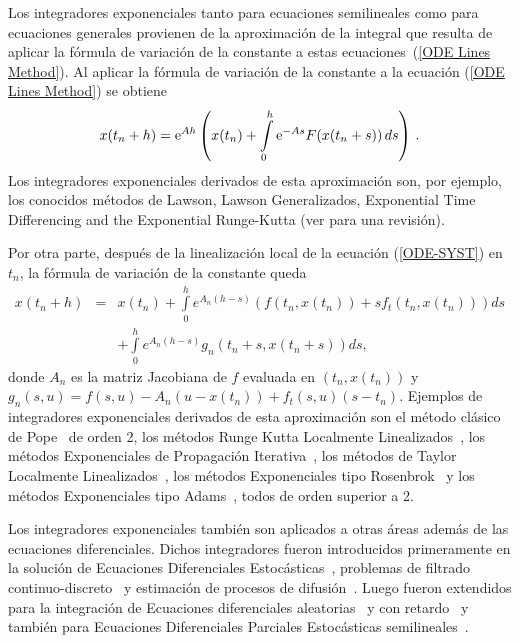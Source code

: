 Los integradores exponenciales tanto para ecuaciones semilineales como para ecuaciones generales provienen de la aproximación de la integral
que resulta de aplicar la fórmula de variación de la constante a estas ecuaciones~(\ref{ODE Lines Method}). Al aplicar la fórmula de variación
de la constante a la ecuación (\ref{ODE Lines Method}) se obtiene
\begin{equation}
x(t_n+h)=\mathrm{e}^{Ah}\left(x(t_n) +\int\limits_{0}^{h} \mathrm{e}^{-As}F(x(t_n+s)) \,ds\right)\,. \label{VCF2}
\end{equation}
Los integradores exponenciales derivados de esta aproximación son, por ejemplo, los conocidos métodos de Lawson, Lawson Generalizados, Exponential Time
Differencing and the Exponential Runge-Kutta (ver \cite{Berland07} para una revisión). 

Por otra parte, después de la linealización local de la ecuación (\ref{ODE-SYST}) en $t_{n}$,  la fórmula de variación
de la constante queda
\begin{eqnarray}
x(t_{n}+h) &= & x(t_{n})+\int\limits_{0}^{h}e^{A	_{n}(h-s)}(f(t_n,x(t_{n}))+sf_t(t_n,x(t_{n})))ds \nonumber \\
 & & +\int\limits_{0}^{h}e^{A
	_{n}(h-s)}g_{n}(t_{n}+s,x(t_{n}+s))ds, \label{VCF}
\end{eqnarray}
donde $A_{n}$ es la matriz Jacobiana de $f$ evaluada en $(t_n,x(t_{n}))$ y $g_{n}(s,u)=f(s,u)-A_{n}(u-x(t_n))+f_t(s,u)(s-t_n)$. 
Ejemplos de integradores exponenciales derivados de esta aproximación son el método clásico de Pope~\cite{pope1963exponential} de orden 2, los métodos Runge Kutta Localmente 
Linealizados~\cite{delaCruz06,Jimenez13,Jimenez14AMC}, los métodos Exponenciales de Propagación 
Iterativa~\cite{tokman2013comparative}, los métodos de Taylor Localmente Linealizados~\cite{delaCruz07}, los
métodos Exponenciales tipo Rosenbrok~\cite{hochbruck2009exponential} y los métodos Exponenciales tipo Adams~\cite{hochbruck2011exponential}, todos de orden superior a 2.

Los integradores exponenciales también son aplicados a otras áreas además de las ecuaciones diferenciales. Dichos integradores fueron introducidos primeramente en la solución de Ecuaciones Diferenciales Estocásticas~\cite{ozaki19852,ozaki1985statistical}, problemas de filtrado continuo-discreto~\cite{ozaki1993local} y estimación de procesos de difusión~\cite{ozaki19852,ozaki1985statistical,ozaki1994local}. Luego fueron extendidos para la integración de Ecuaciones diferenciales aleatorias~\cite{carbonell2005local} y con retardo~\cite{jimenez2006local} y también para Ecuaciones Diferenciales
Parciales Estocásticas semilineales~\cite{jentzen2009overcoming,kloeden2011exponential}.

